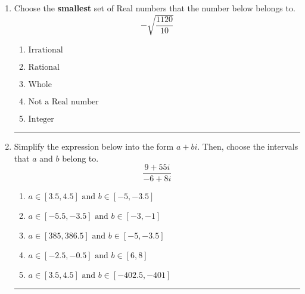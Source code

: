 \documentclass[14pt]{extbook}
\newcommand{\litem}[1]{\item#1\hspace*{-1cm}\rule{\textwidth}{0.4pt}}
\begin{document}
\begin{enumerate}
{\begin{enumerate}[label=\Alph*.]
\end{enumerate} }
\litem{
Choose the \textbf{smallest} set of Real numbers that the number below belongs to.\[ -\sqrt{\frac{1120}{10}} \]\begin{enumerate}[label=\Alph*.]
\item \( \text{Irrational} \)
\item \( \text{Rational} \)
\item \( \text{Whole} \)
\item \( \text{Not a Real number} \)
\item \( \text{Integer} \)

\end{enumerate} }
\litem{
Simplify the expression below into the form $a+bi$. Then, choose the intervals that $a$ and $b$ belong to.\[ \frac{9 + 55 i}{-6 + 8 i} \]\begin{enumerate}[label=\Alph*.]
\item \( a \in [3.5, 4.5] \text{ and } b \in [-5, -3.5] \)
\item \( a \in [-5.5, -3.5] \text{ and } b \in [-3, -1] \)
\item \( a \in [385, 386.5] \text{ and } b \in [-5, -3.5] \)
\item \( a \in [-2.5, -0.5] \text{ and } b \in [6, 8] \)
\item \( a \in [3.5, 4.5] \text{ and } b \in [-402.5, -401] \)

\end{enumerate} }
\end{enumerate}
\end{document}
